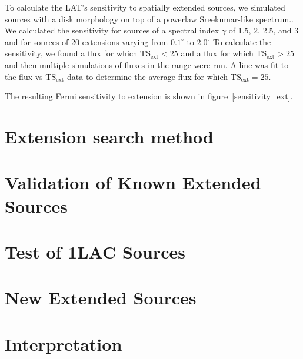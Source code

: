 \documentclass{emulateapj}
\begin{document}
To calculate the LAT's sensitivity to spatially extended sources,
we simulated sources with a disk morphology on top of a powerlaw
Sreekumar-like spectrum.\cite{Sreekumar et al. ApJ 494 pag 523 1998}.
We calculated the sensitivity for sources of a spectral index $\gamma$
of 1.5, 2, 2.5, and 3 and for sources of 20 extensions varying
from $0.1^\circ$ to $2.0^\circ$ To calculate the sensitivity, we
found a flux for which $\text{TS}_\text{ext}<25$ and a flux for which
$\text{TS}_\text{ext}>25$ and then multiple simulations
of fluxes in the range were run. A line was fit to the 
flux vs $\text{TS}_\text{ext}$ data to determine the average
flux for which $\text{TS}_\text{ext}=25$.

The resulting Fermi sensitivity to extension is shown in figure~\ref{sensitivity_ext}.

\section{Extension search method}





\section{Validation of Known Extended Sources}

\section{Test of 1LAC Sources}

\section{New Extended Sources}

\section{Interpretation}
\end{document}
